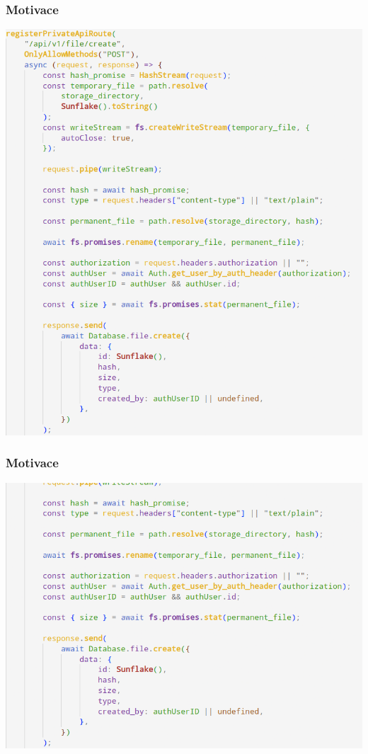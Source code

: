 \begin{frame}
  \frametitle{Motivace}
  \begin{center}
    \includegraphics[width=\textwidth]{img/01-scary-screenshot-2.png}
  \end{center}
\end{frame}

\begin{frame}
  \frametitle{Motivace}
  \begin{center}
    \includegraphics[width=\textwidth]{img/01-scary-screenshot-3.png}
  \end{center}
\end{frame}

